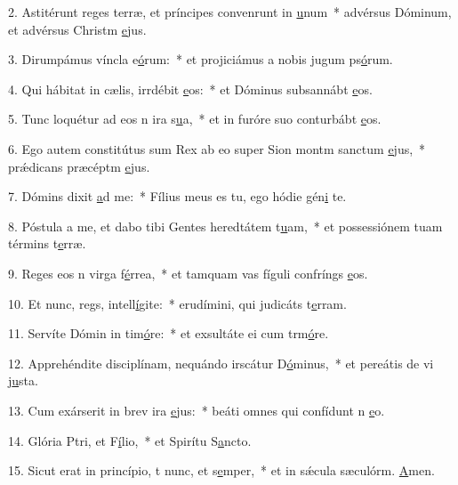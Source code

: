 2. Astitérunt reges terræ, et príncipes convenrunt in \uline{u}num~* advérsus Dóminum, et advérsus Christm \uline{e}jus.\par 
3. Dirumpámus víncla e\uline{ó}rum:~* et projiciámus a nobis jugum ps\uline{ó}rum.\par 
4. Qui hábitat in cælis, irrdébit \uline{e}os:~* et Dóminus subsannábt \uline{e}os.\par 
5. Tunc loquétur ad eos n ira s\uline{u}a,~* et in furóre suo conturbábt \uline{e}os.\par 
6. Ego autem constitútus sum Rex ab eo super Sion montm sanctum \uline{e}jus,~* prǽdicans præcéptm \uline{e}jus.\par 
7. Dómins dixit \uline{a}d me:~* Fílius meus es tu, ego hódie gén\uline{i} te.\par 
8. Póstula a me, et dabo tibi Gentes heredtátem t\uline{u}am,~* et possessiónem tuam términs t\uline{e}rræ.\par 
9. Reges eos n virga f\uline{é}rrea,~* et tamquam vas fíguli confríngs \uline{e}os.\par 
10. Et nunc, regs, intell\uline{í}gite:~* erudímini, qui judicáts t\uline{e}rram.\par 
11. Servíte Dómin in tim\uline{ó}re:~* et exsultáte ei cum trm\uline{ó}re.\par 
12. Apprehéndite disciplínam, nequándo irscátur D\uline{ó}minus,~* et pereátis de vi j\uline{u}sta.\par 
13. Cum exárserit in brev ira \uline{e}jus:~* beáti omnes qui confídunt n \uline{e}o.\par 
14. Glória Ptri, et F\uline{í}lio,~* et Spirítu S\uline{a}ncto.\par 
15. Sicut erat in princípio, t nunc, et s\uline{e}mper,~* et in sǽcula sæculórm. \uline{A}men.\par 
